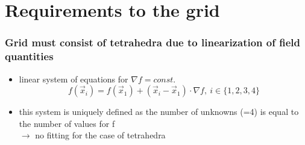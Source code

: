 \documentclass{beamer}
\begin{document}

\section{Requirements to the grid}
\begin{frame}
\frametitle{Grid must consist of tetrahedra due to linearization of field quantities}
\begin{itemize}
	\item linear system of equations for $\nabla f = const.$
 \begin{equation}
		\nonumber
		f(\vec{x}_i) = f(\vec{x}_1) + \left(\vec{x}_i-\vec{x}_1\right)\cdot \nabla f, ~i \in \{1,2,3,4\}
	\end{equation}
	\item this system is uniquely defined as the number of unknowns (=4) is equal to the number of values for f\\
	 $\rightarrow$ no fitting for the case of tetrahedra
\end{itemize}
\end{frame}
\end{document}

